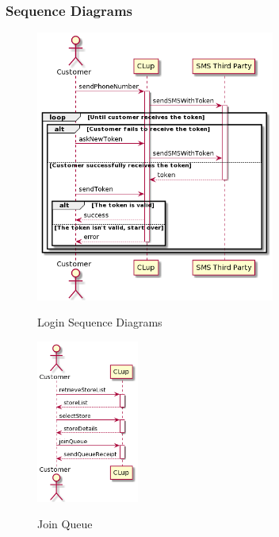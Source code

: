 \subsubsection*{Sequence Diagrams}

\begin{figure}[H]
    \centering
    \includegraphics[width=0.7\textwidth]{uml/login.png}
    \label{fig:seqdiag-login}
    \caption{Login Sequence Diagrams}
\end{figure}

\begin{figure}[H]
    \centering
    \includegraphics[width=0.3\textwidth]{uml/join_queue.png}
    \label{fig:seqdiag-join-queue}
    \caption{Join Queue}
\end{figure}

